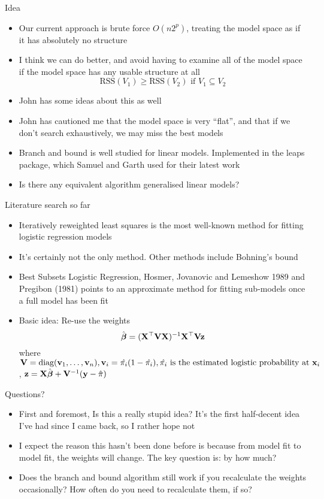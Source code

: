 \documentclass{beamer}
\begin{document}
\begin{frame}{Idea}
\begin{itemize}
\item Our current approach is brute force $O(n 2^p)$, treating the model space as if it has absolutely
			no structure
\item I think we can do better, and avoid having to examine all of the model space if the model space
			has any usable structure at all
			$$\text{RSS}(V_1) \geq \text{RSS}(V_2) \text{ if } V_1 \subseteq V_2$$
\item John has some ideas about this as well
\item John has cautioned me that the model space is very ``flat'', and that if we don't search exhaustively,
			we may miss the best models
\item Branch and bound is well studied for linear models. Implemented in the leaps package, which Samuel
			and Garth used for their latest work
\item Is there any equivalent algorithm generalised linear models?
\end{itemize}
\end{frame}

\begin{frame}{Literature search so far}
\begin{itemize}
\item Iteratively reweighted least squares is the most well-known method for fitting logistic regression
			models
\item It's certainly not the only method. Other methods include Bohning's bound
\item Best Subsets Logistic Regression, Hosmer, Jovanovic and Lemeshow 1989 and Pregibon (1981) points to an 					approximate method for fitting sub-models once a full model has been fit
\item Basic idea: Re-use the weights
$$\hat{{\boldsymbol \beta}} = ({\bf X}^\top {\bf V} {\bf X})^{-1} {\bf X}^\top {\bf V} {\bf z}$$
where ${\bf V} = \text{diag}({\bf v}_1, \ldots, {\bf v}_n), {\bf v}_i = \hat{\pi_i} (1 - \hat{\pi_i}),
\hat{\pi_i} \text{ is the estimated logistic probability at } {\bf x}_i$,
${\bf z} = {\bf X} \hat{{\boldsymbol \beta}} + {\bf V}^{-1} ({\bf y} - \hat{\pi})$
\end{itemize}
\end{frame}

\begin{frame}{Questions?}
\begin{itemize}
\item First and foremost, Is this a really stupid idea? It's the first half-decent idea I've had since I
			came back, so I rather hope not
\item I expect the reason this hasn't been done before is because from model fit to model fit, the weights
			will change. The key question is: by how much?
\item Does the branch and bound algorithm still work if you recalculate the weights occasionally? How often
			do you need to recalculate them, if so?
\end{itemize}
\end{frame}
\end{document}
